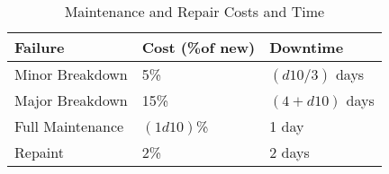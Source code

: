 \documentclass[a4paper,10pt]{article}
\begin{document}

\begin{table}
\begin{center}
  \caption{Maintenance and Repair Costs and Time}
  \begin{tabular}{lll}
    \toprule
    Failure          & Cost (\%of new) & Downtime  \\
    \midrule
    Minor Breakdown  & 5\%             & $(d10 / 3)$ days\\
    Major Breakdown  & 15\%            & $(4 + d10)$ days \\
    Full Maintenance & $(1d10)$\%      & 1 day\\
    Repaint          & 2\%             & 2 days\\
    \bottomrule
  \end{tabular}
\end{center}
\end{table}
\end{document}
